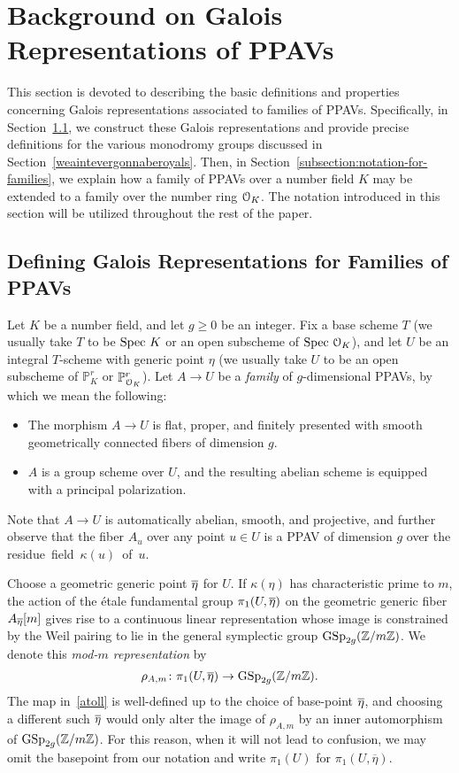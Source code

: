\section{Background on Galois Representations of PPAVs}
\label{section:background}

This section is devoted to describing the basic definitions and properties concerning Galois representations associated to families of PPAVs.
Specifically, in Section~\ref{subsection:setup}, we construct these Galois representations and provide precise definitions for the various monodromy groups discussed in Section~\ref{weaintevergonnaberoyals}. Then, in Section~\ref{subsection:notation-for-families},
we explain how a family of PPAVs over a number field $K$ may be extended to a family over the number ring $\mathcal O_K$. The notation introduced in this section will be utilized throughout the rest of the paper.

\subsection{Defining Galois Representations for Families of PPAVs}\label{subsection:setup}

Let $K$ be a number field, and let $g \geq 0$ be an integer. Fix a base scheme $T$ (we usually take $T$ to be $\text{Spec } K$ or an open subscheme of $\text{Spec } \mathcal O_K$), and let $U$ be an integral $T$-scheme with generic point $\eta$ (we usually take $U$ to be an open subscheme of $\mathbb{P}_K^r$ or $\mathbb{P}_{\mathcal O_K}^r$). Let $A \to U$ be a \emph{family} of $g$-dimensional PPAVs, by which we mean the following:
\begin{itemize}
\item The morphism $A \to U$ is flat, proper, and finitely presented with smooth geometrically connected fibers of dimension $g$.
\item $A$ is a group scheme over $U$, and the resulting abelian scheme is equipped with a principal polarization.
\end{itemize}
Note that $A \rightarrow U$ is automatically abelian, smooth, and projective, and further observe that the fiber $A_u$ over any point $u \in U$ is a PPAV of dimension $g$ over the \mbox{residue field $\kappa(u)$ of $u$.}

Choose a geometric generic point $\overline{\eta}$ for $U$. If $\kappa(\eta)$ has characteristic prime to $m$, the action of the \'{e}tale fundamental group $\pi_1(U,\overline{\eta})$ on the geometric generic fiber $A_{\overline{\eta}}[m]$ gives rise to a continuous linear representation whose image is constrained by the Weil pairing to lie in the general symplectic group $\operatorname{GSp}_{2g}(\mathbb Z/m \mathbb Z)$. We denote this \emph{mod-$m$ representation} by
\begin{equation}\label{atoll}
\rho_{A,m} \colon \pi_1(U, \overline{\eta}) \to \operatorname{GSp}_{2g}(\mathbb Z/m \mathbb Z).
\end{equation}
The map in~\eqref{atoll} is well-defined up to the choice of base-point $\overline{\eta}$, and choosing a different such $\overline{\eta}$ would only alter the image of $\rho_{A,m}$ by an inner automorphism of $\operatorname{GSp}_{2g}(\mathbb Z/m\mathbb Z)$.
For this reason, when it will not lead to confusion, we may omit
the basepoint from our notation and write $\pi_1(U)$ for $\pi_1(U, \overline \eta)$.

